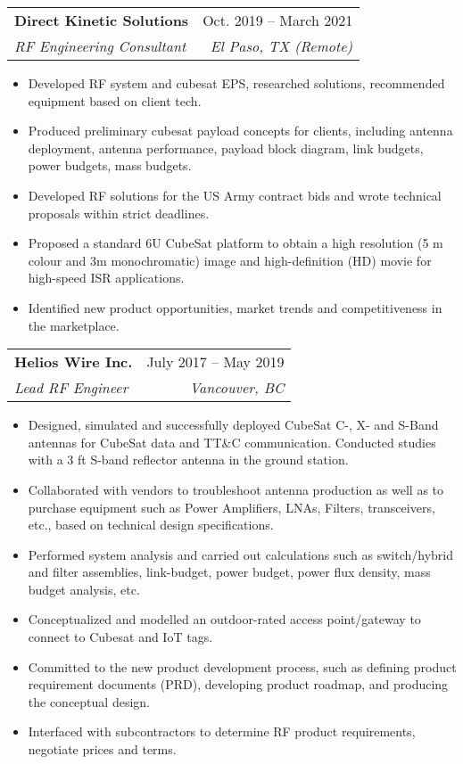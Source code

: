 \documentclass[letterpaper,11pt]{article}
\makeatletter
\newcommand{\resumeItem}[1]{
  \item\small{
    {#1 \vspace{-2pt}}
  }
}
\newcommand{\resumeSubheading}[4]{
  \vspace{-2pt}\item
    \begin{tabular*}{0.97\textwidth}[t]{l@{\extracolsep{\fill}}r}
      \textbf{#1} & #2 \\
      \textit{\small#3} & \textit{\small #4} \\
    \end{tabular*}\vspace{-7pt}
}
\newcommand{\resumeSubSubheading}[2]{
    \item
    \begin{tabular*}{0.97\textwidth}{l@{\extracolsep{\fill}}r}
      \textit{\small#1} & \textit{\small #2} \\
    \end{tabular*}\vspace{-7pt}
}
\newcommand{\resumeSubHeadingListEnd}{\end{itemize}}
\newcommand{\resumeItemListStart}{\begin{itemize}}
\newcommand{\resumeItemListEnd}{\end{itemize}\vspace{-5pt}}
\makeatother
\begin{document}

    \resumeSubheading
      {Direct Kinetic Solutions}{Oct. 2019 -- March 2021}
      {RF Engineering Consultant}{El Paso, TX (Remote)}
      \resumeItemListStart
        \resumeItem{Developed RF system and cubesat EPS, researched solutions, recommended equipment  based on client tech.}
        \resumeItem{Produced preliminary cubesat payload concepts for clients, including antenna deployment, antenna performance, payload block diagram, link budgets, power budgets, mass budgets.}
        \resumeItem{Developed RF solutions for the US Army contract bids and wrote technical proposals within strict deadlines.}
        \resumeItem{Proposed a standard 6U CubeSat platform to obtain a high resolution (5 m colour and 3m monochromatic) image and high-definition (HD) movie for high-speed ISR applications.}
        \resumeItem{Identified new product opportunities, market trends and competitiveness in the marketplace.}
    \resumeItemListEnd

    \resumeSubheading
      {Helios Wire Inc.}{July 2017 -- May 2019}
      {Lead RF Engineer}{Vancouver, BC}
      \resumeItemListStart
        \resumeItem{Designed, simulated and successfully deployed CubeSat C-, X- and S-Band antennas for CubeSat data and TT\&C communication. Conducted studies with a 3 ft S-band reflector antenna in the ground station.}
        \resumeItem{Collaborated with vendors to troubleshoot antenna production as well as to purchase equipment such as Power Amplifiers, LNAs, Filters, transceivers, etc., based on technical design specifications.}
        \resumeItem{Performed system analysis and carried out calculations such as switch/hybrid and filter assemblies, link-budget, power budget, power flux density, mass budget analysis, etc.}
        \resumeItem{Conceptualized and modelled an outdoor-rated access point/gateway to connect to Cubesat and IoT tags.}
        \resumeItem{Committed to the new product development process, such as defining product requirement documents (PRD), developing product roadmap, and producing the conceptual design.}
        \resumeItem{Interfaced with subcontractors to determine RF product requirements, negotiate prices and terms.}
      \resumeItemListEnd
\end{document}
